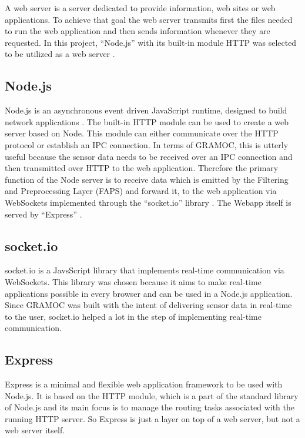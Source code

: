 A web server is a server dedicated to provide information, web sites or web applications. To achieve that goal the web server transmits first the files needed to run the web application and then sends information whenever they are requested. In this project, ``Node.js'' with its built-in module HTTP was selected to be utilized as a web server \cite{Node}.

\subsection{Node.js}
\label{subsec:nodejs}
Node.js is an asynchronous event driven JavaScript runtime, designed to build network applications \cite{Node}. The built-in HTTP module can be used to create a web server based on Node. This module can either communicate over the HTTP protocol or establish an IPC connection. In terms of GRAMOC, this is utterly useful because the sensor data needs to be received over an IPC connection and then transmitted over HTTP to the web application. Therefore the primary function of the Node server is to receive data which is emitted by the Filtering and Preprocessing Layer (FAPS) and forward it, to the web application via WebSockets implemented through the ``socket.io'' library \cite{socketio}. The Webapp itself is served by ``Express'' \cite{express}.

\subsection{socket.io}
\label{subsec:socketio}
socket.io is a JavsScript library that implements real-time communication via WebSockets. This library was chosen because it aims to make real-time applications possible in every browser and can be used in a Node.js application. Since GRAMOC was built with the intent of delivering sensor data in real-time to the user, socket.io helped a lot in the step of implementing real-time communication.

\subsection{Express}
Express is a minimal and flexible web application framework to be used with Node.js. It is based on the HTTP module, which is a part of the standard library of Node.js and its main focus is to manage the routing tasks associated with the running HTTP server. So Express is just a layer on top of a web server, but not a web server itself.

